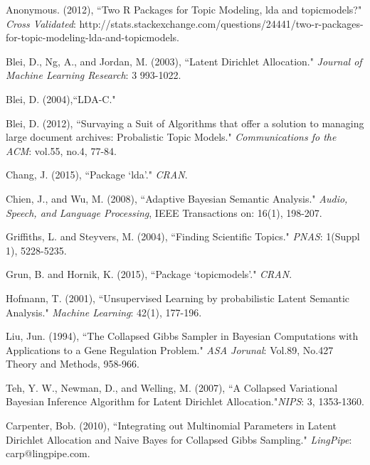 \documentclass[3p,times]{elsarticle}
\begin{document}
\begin{thebibliography}{4}
	Anonymous. (2012),
	``Two R Packages for Topic Modeling, lda and topicmodels?" \textit{Cross Validated}: http://stats.stackexchange.com/questions/24441/two-r-packages-for-topic-modeling-lda-and-topicmodels.
	
	Blei, D., Ng, A., and Jordan, M.  (2003),
	``Latent Dirichlet Allocation."
	\textit{Journal of Machine Learning Research}: 3 993-1022.
	
	Blei, D. (2004),``LDA-C."
	
	Blei, D.  (2012),
	``Survaying a Suit of Algorithms that offer a solution to managing large document archives:          Probalistic Topic Models." \textit{Communications fo the ACM}: vol.55, no.4, 77-84.
	
	Chang, J.  (2015),
	``Package `lda'."
	\textit{CRAN}.
	
	Chien, J., and Wu, M.  (2008),
	``Adaptive Bayesian Semantic Analysis."
	\textit{Audio, Speech, and Language Processing}, IEEE Transactions on: 16(1), 198-207.
	
	Griffiths, L. and Steyvers, M.  (2004),
	``Finding Scientific Topics."
	\textit{PNAS}: 1(Suppl 1), 5228-5235.
	
	Grun, B. and Hornik, K.  (2015),
	``Package `topicmodels'."
	\textit{CRAN}.
	
	Hofmann, T.  (2001),
	``Unsupervised Learning by probabilistic Latent Semantic Analysis."
	\textit{Machine Learning}: 42(1), 177-196.
	
	Liu, Jun.  (1994),
	``The Collapsed Gibbs Sampler in Bayesian Computations with Applications to a Gene Regulation Problem." \textit{ASA Jorunal}: Vol.89, No.427 Theory and Methods, 958-966.
	
	Teh, Y. W., Newman, D., and Welling, M.  (2007),
	``A Collapsed Variational Bayesian Inference Algorithm for Latent Dirichlet 
	Allocation."\textit{NIPS}: 3, 1353-1360.
	
	Carpenter, Bob. (2010),
	``Integrating out Multinomial Parameters in Latent Dirichlet Allocation and Naive       Bayes for Collapsed Gibbs Sampling."
	\textit{LingPipe}: carp@lingpipe.com.
	
	
\end{thebibliography}
\end{document}

